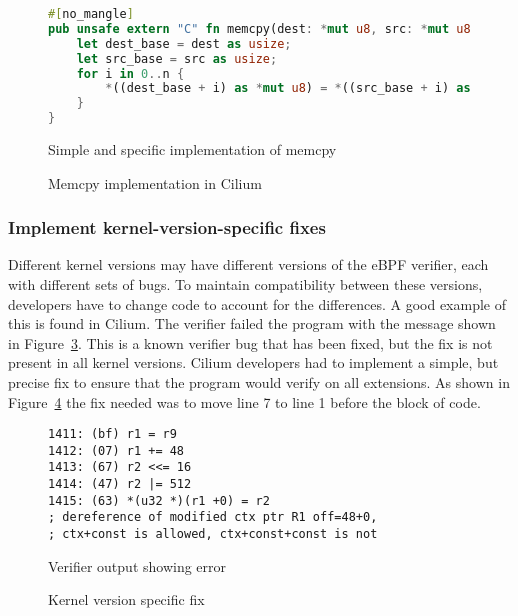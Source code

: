 \begin{figure}
    \begin{lstlisting}[language=rust]
#[no_mangle]
pub unsafe extern "C" fn memcpy(dest: *mut u8, src: *mut u8, n: usize) {
    let dest_base = dest as usize;
    let src_base = src as usize;
    for i in 0..n {
        *((dest_base + i) as *mut u8) = *((src_base + i) as *mut u8);
    }
}
    \end{lstlisting}
    \caption{Simple and specific implementation of memcpy}
    \label{fig:aya-memcpy}
\end{figure}

\begin{figure}
    
    \caption{Memcpy implementation in Cilium}
    \label{fig:cilium-memcpy}
\end{figure}

\subsubsection{Implement kernel-version-specific fixes}
\label{motivation:kernel-version}
Different kernel versions may have different versions of the eBPF verifier, each with different sets of bugs.
To maintain compatibility between these versions, developers have to change code to account for the differences.
A good example of this is found in Cilium.
The verifier failed the program with the message shown in Figure~\ref{fig:kernel-version}.
This is a known verifier bug that has been fixed, but the fix is not present in all kernel versions.
Cilium developers had to implement a simple, but precise fix to ensure that the program would verify on all extensions.
As shown in Figure~\ref{fig:kernel-version-code} the fix needed was to move line 7 to line 1 before the block of code.

\begin{figure}
    \begin{lstlisting}[language=myBPF]
1411: (bf) r1 = r9
1412: (07) r1 += 48
1413: (67) r2 <<= 16
1414: (47) r2 |= 512
1415: (63) *(u32 *)(r1 +0) = r2
; dereference of modified ctx ptr R1 off=48+0,
; ctx+const is allowed, ctx+const+const is not
    \end{lstlisting}
    \caption{Verifier output showing error}
    \label{fig:kernel-version}
\end{figure}

\begin{figure}
    
    \caption{Kernel version specific fix}
    \label{fig:kernel-version-code}
\end{figure}

